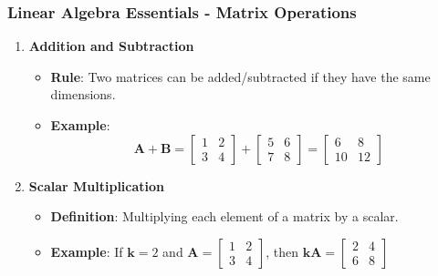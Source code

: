 \documentclass{beamer}
\begin{document}
\begin{frame}[fragile]
    \frametitle{Linear Algebra Essentials - Matrix Operations}
    \begin{enumerate}
        \item \textbf{Addition and Subtraction}
        \begin{itemize}
            \item \textbf{Rule}: Two matrices can be added/subtracted if they have the same dimensions.
            \item \textbf{Example}:  
            \[
            \mathbf{A} + \mathbf{B} = 
            \begin{bmatrix}
            1 & 2 \\
            3 & 4
            \end{bmatrix}
            +
            \begin{bmatrix}
            5 & 6 \\
            7 & 8
            \end{bmatrix}
            =
            \begin{bmatrix}
            6 & 8 \\
            10 & 12
            \end{bmatrix}
            \]
        \end{itemize} 

        \item \textbf{Scalar Multiplication}
        \begin{itemize}
            \item \textbf{Definition}: Multiplying each element of a matrix by a scalar.
            \item \textbf{Example}: If $\mathbf{k} = 2$ and $\mathbf{A} = 
            \begin{bmatrix}
            1 & 2 \\
            3 & 4
            \end{bmatrix}$, then 
            $\mathbf{kA} = 
            \begin{bmatrix}
            2 & 4 \\
            6 & 8
            \end{bmatrix}
            $
        \end{itemize}
        

\end{enumerate}
\end{frame}
\end{document}
